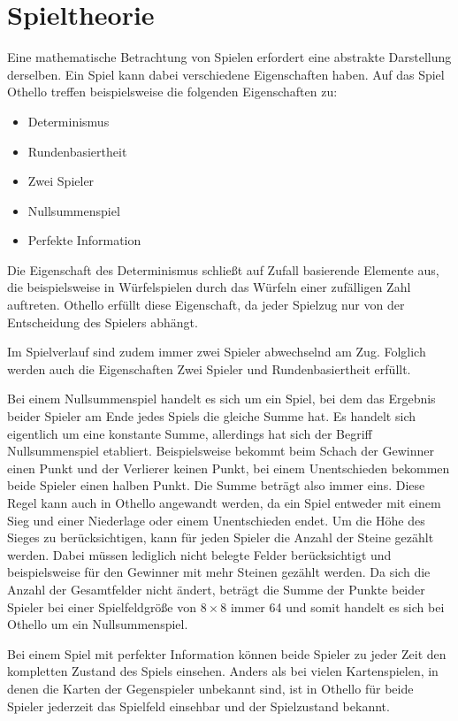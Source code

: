 \section{Spieltheorie}
\label{sec:spieltheorie}

Eine mathematische Betrachtung von Spielen erfordert eine abstrakte Darstellung derselben. Ein Spiel kann dabei
verschiedene Eigenschaften haben. Auf das Spiel Othello treffen beispielsweise die folgenden Eigenschaften zu:

\begin{itemize}
    \item Determinismus
    \item Rundenbasiertheit
    \item Zwei Spieler
    \item Nullsummenspiel
    \item Perfekte Information
\end{itemize}

Die Eigenschaft des Determinismus schließt auf Zufall basierende Elemente aus, die beispielsweise in Würfelspielen durch
das Würfeln einer zufälligen Zahl auftreten. Othello erfüllt diese Eigenschaft, da jeder Spielzug nur von der
Entscheidung des Spielers abhängt.

Im Spielverlauf sind zudem immer zwei Spieler abwechselnd am Zug. Folglich werden auch die Eigenschaften Zwei Spieler
und Rundenbasiertheit erfüllt.

Bei einem Nullsummenspiel handelt es sich um ein Spiel, bei dem das Ergebnis beider Spieler am Ende jedes Spiels die
gleiche Summe hat. Es handelt sich eigentlich um eine konstante Summe, allerdings hat sich der Begriff Nullsummenspiel
etabliert. Beispielsweise bekommt beim Schach der Gewinner einen Punkt und der Verlierer keinen Punkt, bei einem Unentschieden
bekommen beide Spieler einen halben Punkt. Die Summe beträgt also immer eins. Diese Regel kann auch in Othello angewandt
werden, da ein Spiel entweder mit einem Sieg und einer Niederlage oder einem Unentschieden endet. Um die Höhe des Sieges
zu berücksichtigen, kann für jeden Spieler die Anzahl der Steine gezählt werden. Dabei müssen lediglich nicht belegte
Felder berücksichtigt und beispielsweise für den Gewinner mit mehr Steinen gezählt werden. Da sich die Anzahl der
Gesamtfelder nicht ändert, beträgt die Summe der Punkte beider Spieler bei einer Spielfeldgröße von $8\times 8$ immer 64
und somit handelt es sich bei Othello um ein Nullsummenspiel.

Bei einem Spiel mit perfekter Information können beide Spieler zu jeder Zeit den kompletten Zustand des Spiels einsehen.
Anders als bei vielen Kartenspielen, in denen die Karten der Gegenspieler unbekannt sind, ist in Othello für beide
Spieler jederzeit das Spielfeld einsehbar und der Spielzustand bekannt.
\cite[S.~161f.]{ai2010russel}

